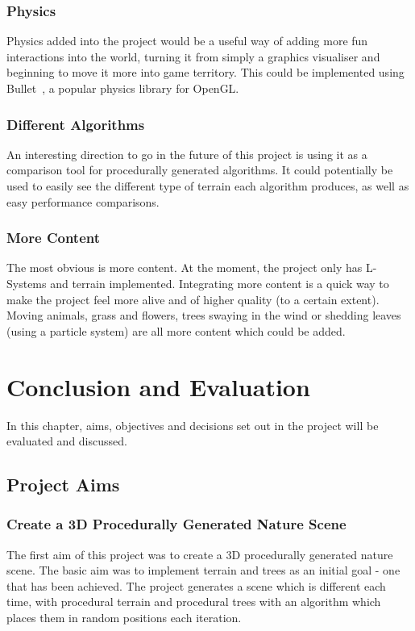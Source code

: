 \documentclass[a4paper,10pt]{report}
\begin{document}
\subsection{Physics}

Physics added into the project would be a useful way of adding more fun interactions into the world, turning it from simply a graphics visualiser and beginning to move it more into game territory. This could be implemented using Bullet~\cite{coumans2013bullet}, a popular physics library for OpenGL. 

\subsection{Different Algorithms}
An interesting direction to go in the future of this project is using it as a comparison tool for procedurally generated algorithms. It could potentially be used to easily see the different type of terrain each algorithm produces, as well as easy performance comparisons. 

\subsection{More Content}
The  most obvious is more content. At the moment, the project only has L-Systems and terrain implemented. Integrating more content is a quick way to make the project feel more alive and of higher quality (to a certain extent). Moving animals, grass and flowers, trees swaying in the wind or shedding leaves (using a particle system) are all more content which could be added.

\chapter{Conclusion and Evaluation}
In this chapter, aims, objectives and decisions set out in the project will be evaluated and discussed. 

\section{Project Aims}
\subsection{Create a 3D Procedurally Generated Nature Scene}
The first aim of this project was to create a 3D procedurally generated nature scene. The basic aim was to implement terrain and trees as an initial goal - one that has been achieved. The project generates a scene which is different each time, with procedural terrain and procedural trees with an algorithm which places them in random positions each iteration. \medskip
\end{document}
